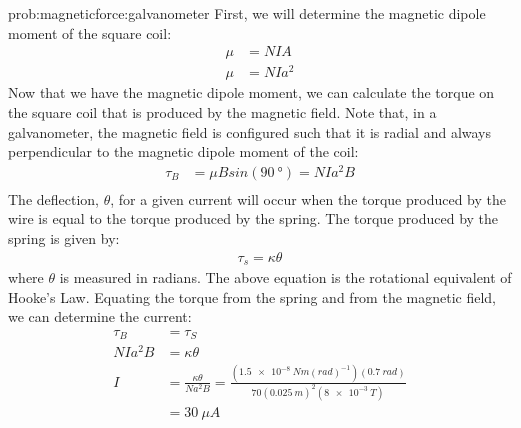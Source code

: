 \begin{solution}{prob:magneticforce:galvanometer}\label{soln:magneticforce:galvanometer}
First, we will determine the magnetic dipole moment of the square coil:
\begin{align*}
\mu &= NIA\\
\mu &=NIa^2
\end{align*}
Now that we have the magnetic dipole moment, we can calculate the torque on the square coil that is produced by the magnetic field. Note that, in a galvanometer, the magnetic field is configured such that it is radial and always perpendicular to the magnetic dipole moment of the coil:
\begin{align*}
\tau_B &= \mu B sin(\SI{90}{\degree})= NIa^2B\\
\end{align*}
The deflection, $\theta$, for a given current will occur when the torque produced by the wire is equal to the torque produced by the spring. The torque produced by the spring is given by:
\begin{align*}
\tau_s =\kappa \theta
\end{align*} 
where $\theta$ is measured in radians. The above equation is the rotational equivalent of Hooke's Law. Equating the torque from the spring and from the magnetic field, we can determine the current:
\begin{align*}
\tau_B&=\tau_S\\
NIa^2B &= \kappa \theta\\
I &= \frac{\kappa \theta}{Na^2B} = \frac{(\SI{1.5e-8}{Nm(rad)^{-1}}) (\SI{0.7}{rad})}{70(\SI{0.025}{m})^2(\SI{8e-3}{T})}\\
&= \SI{30}{\mu A}
\end{align*}
\end{solution}

